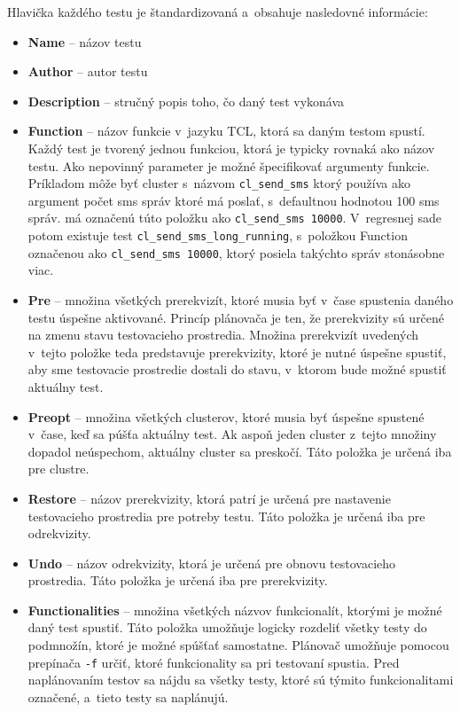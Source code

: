 Hlavička každého testu je štandardizovaná a~obsahuje nasledovné informácie:
\begin{itemize}
\item \textbf{Name} -- názov testu
\item \textbf{Author} -- autor testu
\item \textbf{Description} -- stručný popis toho, čo daný test vykonáva
\item \textbf{Function} -- názov funkcie v~jazyku TCL, ktorá sa daným testom spustí. Každý test je tvorený jednou funkciou, ktorá je typicky rovnaká
ako názov testu. Ako nepovinný parameter je možné špecifikovať argumenty funkcie. Príkladom môže byť cluster s~názvom \texttt{cl\_send\_sms} ktorý používa
ako argument počet sms správ ktoré má poslať, s~defaultnou hodnotou 100 sms správ.  
má označenú túto položku ako \texttt{cl\_send\_sms 10000}. V~regresnej sade potom existuje test \texttt{cl\_send\_sms\_long\_running}, 
s~položkou Function označenou ako \texttt{cl\_send\_sms 10000}, ktorý posiela takýchto správ stonásobne viac.
\item \textbf{Pre} -- množina všetkých prerekvizít, ktoré musia byť v~čase spustenia daného testu úspešne aktivované. Princíp plánovača je ten,
že prerekvizity sú určené na zmenu stavu testovacieho prostredia. Množina prerekvizít uvedených v~tejto položke teda predstavuje prerekvizity, ktoré
je nutné úspešne spustiť, aby sme testovacie prostredie dostali do stavu, v~ktorom bude možné spustiť aktuálny test.
\item \textbf{Preopt} -- množina všetkých clusterov, ktoré musia byť úspešne spustené v~čase, keď sa púšťa aktuálny test. Ak aspoň jeden cluster z~tejto množiny
dopadol neúspechom, aktuálny cluster sa preskočí. Táto položka je určená iba pre clustre.
\item \textbf{Restore} -- názov prerekvizity, ktorá patrí je určená pre nastavenie testovacieho prostredia pre potreby testu. Táto položka je určená iba pre odrekvizity.
\item \textbf{Undo} -- názov odrekvizity, ktorá je určená pre obnovu testovacieho prostredia. Táto položka je určená iba pre prerekvizity. 
\item \textbf{Functionalities} -- množina všetkých názvov funkcionalít, ktorými je možné daný test spustiť. 
Táto položka umožňuje logicky rozdeliť všetky testy do podmnožín, ktoré je možné spúšťať samostatne. 
Plánovač umožňuje pomocou prepínača \texttt{-f} určiť, ktoré funkcionality sa pri testovaní spustia.
Pred naplánovaním testov sa nájdu sa všetky testy, ktoré sú týmito funkcionalitami označené, a~tieto testy sa naplánujú.

\end{itemize}
